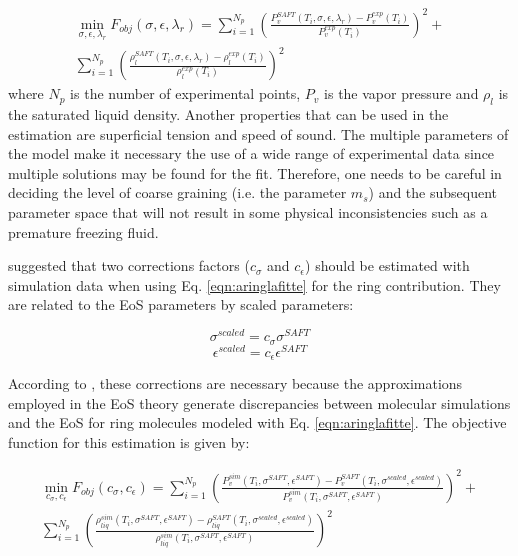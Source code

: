 \begin{equation}
\begin{aligned}
\min\limits_{\sigma,\epsilon,\lambda_{r}} F_{obj}(\sigma,\epsilon,\lambda_{r})= \sum_{i=1}^{N_{p}} \left(\frac{P_{v}^{SAFT}(T_{i},\sigma,\epsilon,\lambda_{r})-P_{v}^{exp}(T_{i})}{P_{v}^{exp}(T_{i})} \right)^2 +\\
\sum_{i=1}^{N_{p}} \left(\frac{\rho_{l}^{SAFT}(T_{i},\sigma,\epsilon,\lambda_{r})-\rho_{l}^{exp}(T_{i})}{\rho_{l}^{exp}(T_{i})} \right)^2
\end{aligned}
\label{eqn:fobj}
\end{equation}
where $N_{p}$ is the number of experimental points, $P_{v}$ is the vapor pressure and $\rho_{l}$ is the saturated liquid density. Another properties that can be used in the estimation are superficial tension and speed of sound. The multiple parameters of the model make it necessary the use of a wide range of experimental data since multiple solutions may be found for the fit. Therefore, one needs to be careful in deciding the level of coarse graining (i.e. the parameter $m_{s}$) and the subsequent parameter space that will not result in some physical inconsistencies such as a premature freezing fluid.

 suggested that two corrections factors ($c_{\sigma}$ and $c_{\epsilon}$) should be estimated with simulation data when using Eq. \eqref{eqn:aringlafitte} for the ring contribution. They are related to the EoS parameters by scaled parameters:

\begin{equation}
\sigma^{scaled} = c_{\sigma}\sigma^{SAFT}
\label{eqn:csigma}
\end{equation}
\begin{equation}
\epsilon^{scaled} = c_{\epsilon}\epsilon^{SAFT}
\label{eqn:ceps}
\end{equation}

According to , these corrections are necessary because the approximations employed in the EoS theory generate discrepancies between molecular simulations and the EoS for ring molecules modeled with Eq. \eqref{eqn:aringlafitte}. The objective function for this estimation is given by:

\begin{equation}
\begin{split}
\min\limits_{c_{\sigma},c_{\epsilon}} F_{obj}(c_{\sigma},c_{\epsilon})= \sum_{i=1}^{N_{p}} \left(\frac{P_{v}^{sim}(T_{i},\sigma^{SAFT},\epsilon^{SAFT})-P_{v}^{SAFT}(T_{i},\sigma^{scaled},\epsilon^{scaled})}{P_{v}^{sim}(T_{i},\sigma^{SAFT},\epsilon^{SAFT})} \right)^2 + \\
\sum_{i=1}^{N_{p}} \left(\frac{\rho_{liq}^{sim}(T_{i},\sigma^{SAFT},\epsilon^{SAFT})-\rho_{liq}^{SAFT}(T_{i},\sigma^{scaled},\epsilon^{scaled})}{\rho_{liq}^{sim}(T_{i},\sigma^{SAFT},\epsilon^{SAFT})} \right)^2
\end{split}
\label{eqn:fobjla}
\end{equation}

